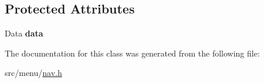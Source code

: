 \subsection*{Protected Attributes}
\begin{DoxyCompactItemize}
\item 
\mbox{\label{classStaticNav_ae7e0d3f8df6dc9236899143a105d7300}} 
Data {\bfseries data}
\end{DoxyCompactItemize}


The documentation for this class was generated from the following file\+:\begin{DoxyCompactItemize}
\item 
src/menu/\hyperlink{nav_8h}{nav.\+h}\end{DoxyCompactItemize}
